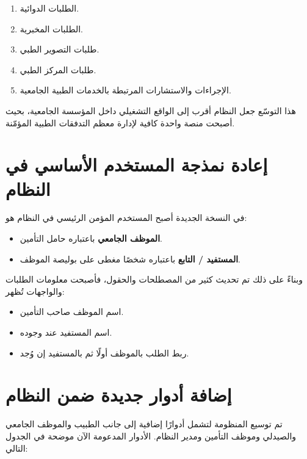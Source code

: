 \documentclass[12pt,a4paper]{report}
\begin{document}
\begin{enumerate}[itemsep=4pt]
  \item الطلبات الدوائية.
  \item الطلبات المخبرية.
  \item طلبات التصوير الطبي.
  \item طلبات المركز الطبي.
  \item الإجراءات والاستشارات المرتبطة بالخدمات الطبية الجامعية.
\end{enumerate}

هذا التوسّع جعل النظام أقرب إلى الواقع التشغيلي داخل المؤسسة الجامعية، بحيث أصبحت منصة واحدة كافية لإدارة معظم التدفقات الطبية المؤمّنة.

\section{إعادة نمذجة المستخدم الأساسي في النظام}

في النسخة الجديدة أصبح المستخدم المؤمن الرئيسي في النظام هو:

\begin{itemize}[itemsep=4pt]
  \item \textbf{الموظف الجامعي} باعتباره حامل التأمين.
  \item \textbf{المستفيد / التابع} باعتباره شخصًا مغطى على بوليصة الموظف.
\end{itemize}

وبناءً على ذلك تم تحديث كثير من المصطلحات والحقول، فأصبحت معلومات الطلبات والواجهات تُظهر:

\begin{itemize}[itemsep=4pt]
  \item اسم الموظف صاحب التأمين.
  \item اسم المستفيد عند وجوده.
  \item ربط الطلب بالموظف أولًا ثم بالمستفيد إن وُجد.
\end{itemize}

\section{إضافة أدوار جديدة ضمن النظام}

تم توسيع المنظومة لتشمل أدوارًا إضافية إلى جانب الطبيب والموظف الجامعي والصيدلي وموظف التأمين ومدير النظام. الأدوار المدعومة الآن موضحة في الجدول التالي:
\end{document}
